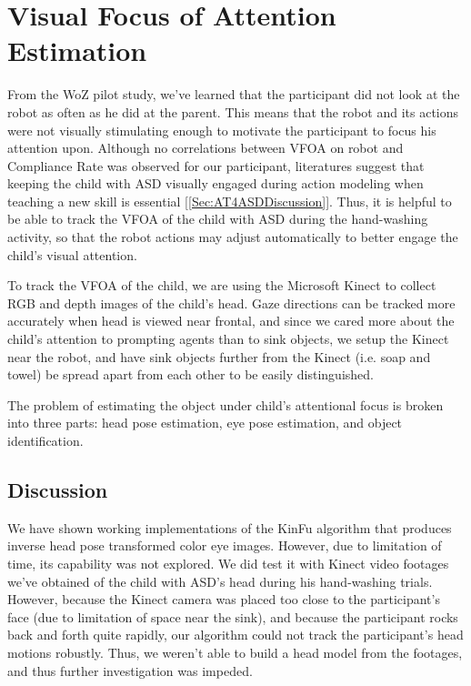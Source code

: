 \chapter{Visual Focus of Attention Estimation}
From the WoZ pilot study, we've learned that the participant did not look at the robot as often as he did at the parent.  This means that the robot and its actions were not visually stimulating enough to motivate the participant to focus his attention upon.  Although no correlations between VFOA on robot and Compliance Rate was observed for our participant, literatures suggest that keeping the child with ASD visually engaged during action modeling when teaching a new skill is essential [\ref{Sec:AT4ASDDiscussion}].  Thus, it is helpful to be able to track the VFOA of the child with ASD during the hand-washing activity, so that the robot actions may adjust automatically to better engage the child's visual attention.

To track the VFOA of the child, we are using the Microsoft Kinect to collect RGB and depth images of the child's head.  Gaze directions can be tracked more accurately when head is viewed near frontal, and since we cared more about the child's attention to prompting agents than to sink objects, we setup the Kinect near the robot, and have sink objects further from the Kinect (i.e. soap and towel) be spread apart from each other to be easily distinguished.

The problem of estimating the object under child's attentional focus is broken into three parts: head pose estimation, eye pose estimation, and object identification.


%
%	
%	







\section{Discussion}
We have shown working implementations of the KinFu algorithm that produces inverse head pose transformed color eye images.  However, due to limitation of time, its capability was not explored.  We did test it with Kinect video footages we've obtained of the child with ASD's head during his hand-washing trials.  However, because the Kinect camera was placed too close to the participant's face (due to limitation of space near the sink), and because the participant rocks back and forth quite rapidly, our algorithm could not track the participant's head motions robustly.  Thus, we weren't able to build a head model from the footages, and thus further investigation was impeded.

